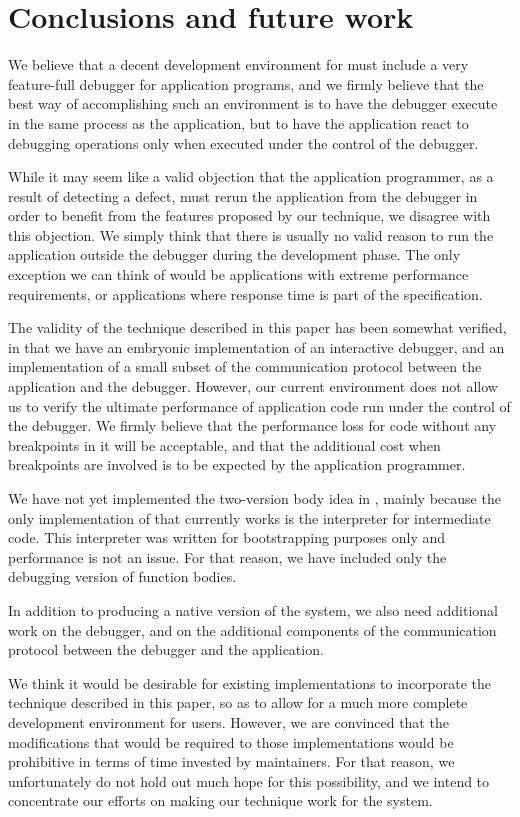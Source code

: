 \section{Conclusions and future work}

We believe that a decent development environment for \commonlisp{}
must include a very feature-full debugger for application programs, and
we firmly believe that the best way of accomplishing such an
environment is to have the debugger execute in the same process as the
application, but to have the application react to debugging operations
only when executed under the control of the debugger.

While it may seem like a valid objection that the application
programmer, as a result of detecting a defect, must rerun the
application from the debugger in order to benefit from the features
proposed by our technique, we disagree with this objection.  We simply
think that there is usually no valid reason to run the application
outside the debugger during the development phase.  The only exception
we can think of would be applications with extreme performance
requirements, or applications where response time is part of the
specification.

The validity of the technique described in this paper has been
somewhat verified, in that we have an embryonic implementation of an
interactive debugger, and an implementation of a small subset of the
communication protocol between the application and the debugger.
However, our current environment does not allow us to verify the
ultimate performance of application code run under the control of the
debugger.  We firmly believe that the performance loss for code
without any breakpoints in it will be acceptable, and that the
additional cost when breakpoints are involved is to be expected by the
application programmer.

We have not yet implemented the two-version body idea in \sicl{},
mainly because the only implementation of \sicl{} that currently works
is the interpreter for intermediate code.  This interpreter was
written for bootstrapping purposes only and performance is not an
issue.  For that reason, we have included only the debugging version
of function bodies.

In addition to producing a native version of the \sicl{} system, we
also need additional work on the \clordane{} debugger, and on the
additional components of the communication protocol between the
debugger and the application.

We think it would be desirable for existing \commonlisp{}
implementations to incorporate the technique described in this paper,
so as to allow for a much more complete development environment for
users.  However, we are convinced that the modifications that would be
required to those implementations would be prohibitive in terms of
time invested by maintainers.  For that reason, we unfortunately do
not hold out much hope for this possibility, and we intend to
concentrate our efforts on making our technique work for the \sicl{}
system.
